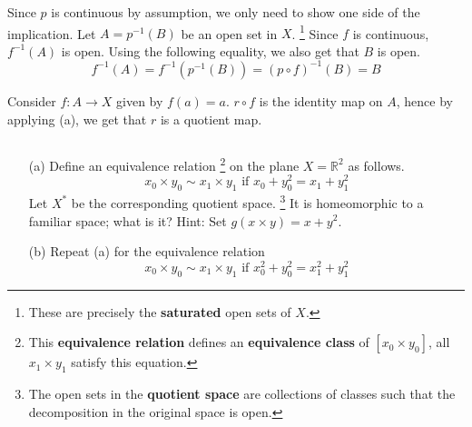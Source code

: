 \documentclass[../main.tex]{subfiles}
\begin{document}
Since $p$ is continuous by assumption, we only need to show one side of the implication.
Let $A = p^{-1}(B)$ be an open set in $X$.
\footnote{These are precisely the \textbf{saturated} open sets of $X$.}
Since $f$ is continuous, $f^{-1}(A)$ is open.
Using the following equality, we also get that $B$ is open.
\begin{equation*}
	f^{-1}(A) = f^{-1}(p^{-1}(B)) = (p \circ f)^{-1}(B) = B
\end{equation*}

Consider $f: A \to X$ given by $f(a) = a$.
$r \circ f$ is the identity map on $A$, hence by applying (a), we  get that $r$ is a quotient map.

\begin{problem}[\S 22 Ex. 4]
    $ $
    \begin{itemize}
        \item[(a)]
            Define an equivalence relation
            \footnote{This \textbf{equivalence relation} defines an \textbf{equivalence class} of $[x_0 \times y_0]$, all $x_1 \times y_1$ satisfy this equation.}
            on the plane $X = \mathbb{R}^2$ as follows.
            \begin{equation*}
                x_0 \times y_0 \sim x_1 \times y_1 \text{ if } x_0 + y_0^2 = x_1 + y_1^2
            \end{equation*}
            Let $X^*$ be the corresponding quotient space.
            \footnote{The open sets in the \textbf{quotient space} are collections of classes such that the decomposition in the original space is open.}
            It is homeomorphic to a familiar space; what is it?
            Hint: Set $g(x \times y) = x + y^2$.

        \item[(b)]
            Repeat (a) for the equivalence relation
            \begin{equation*}
                x_0 \times y_0 \sim x_1 \times y_1 \text{ if } x_0^2 + y_0^2 = x_1^2 + y_1^2
            \end{equation*}
    \end{itemize}
\end{problem}
\end{document}
